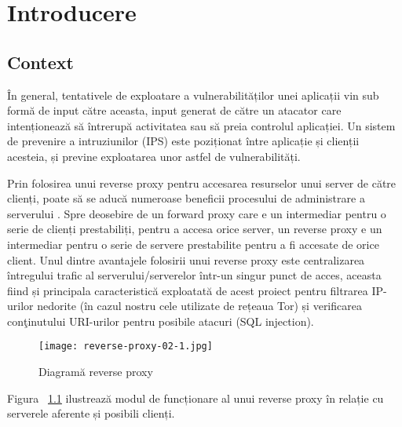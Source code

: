 
\chapter{Introducere}
\label{cap:Introducere}


\section{Context}

În general, tentativele de exploatare a vulnerabilităților unei aplicații vin sub formă de input către aceasta, input generat de către un atacator care intenționează să întrerupă activitatea sau să preia controlul aplicației. Un sistem de prevenire a intruziunilor (IPS) este poziționat între aplicație și clienții acesteia, și previne exploatarea unor astfel de vulnerabilități. 

Prin folosirea unui reverse proxy pentru accesarea resurselor unui server de către clienți, poate să se aducă numeroase beneficii procesului de administrare a serverului \cite{top_8}. Spre deosebire de un forward proxy care e un intermediar pentru o serie de clienți prestabiliți, pentru a accesa orice server, un reverse proxy e un intermediar pentru o serie de servere prestabilite pentru a fi accesate de orice client. Unul dintre avantajele folosirii unui reverse proxy este centralizarea întregului trafic al serverului/serverelor într-un singur punct de acces, aceasta fiind și principala caracteristică exploatată de acest proiect pentru filtrarea IP-urilor nedorite (în cazul nostru cele utilizate de rețeaua Tor) și verificarea conţinutului URI-urilor pentru posibile atacuri (SQL injection).

\begin{figure}[h]
	\centering
	\texttt{[image: reverse-proxy-02-1.jpg]}
	\caption{ Diagramă reverse proxy }
	\label{fig:reverse-proxy}
\end{figure}

Figura ~\ref{fig:reverse-proxy}  ilustrează modul de funcționare al unui reverse proxy în relație cu serverele aferente și posibili clienți.  \\

 

